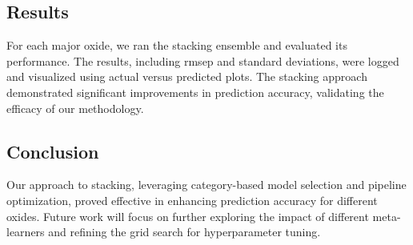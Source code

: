 \subsection{Results}

For each major oxide, we ran the stacking ensemble and evaluated its performance.
The results, including \gls{rmsep} and standard deviations, were logged and visualized using actual versus predicted plots.
The stacking approach demonstrated significant improvements in prediction accuracy, validating the efficacy of our methodology.


\subsection{Conclusion}

Our approach to stacking, leveraging category-based model selection and pipeline optimization, proved effective in enhancing prediction accuracy for different oxides.
Future work will focus on further exploring the impact of different meta-learners and refining the grid search for hyperparameter tuning.